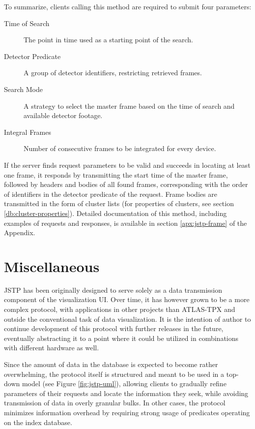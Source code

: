 To summarize, clients calling this method are required to submit four parameters:
\begin{description}
	\item[Time of Search]
	The point in time used as a starting point of the search.

	\item[Detector Predicate]
	A group of detector identifiers, restricting retrieved frames.

	\item[Search Mode]
	A strategy to select the master frame based on the time of search and available detector footage.

	\item[Integral Frames]
	Number of consecutive frames to be integrated for every device.
\end{description}

If the server finds request parameters to be valid and succeeds in locating at least one frame, it responds by transmitting the start time of the master frame, followed by headers and bodies of all found frames, corresponding with the order of identifiers in the detector predicate of the request. Frame bodies are transmitted in the form of cluster lists (for properties of clusters, see section \ref{db:cluster-properties}). Detailed documentation of this method, including examples of requests and responses, is available in section \ref{apx:jstp-frame} of the Appendix.

\section{Miscellaneous}
JSTP has been originally designed to serve solely as a data transmission component of the visualization UI. Over time, it has however grown to be a more complex protocol, with applications in other projects than ATLAS-TPX and outside the conventional task of data visualization. It is the intention of author to continue development of this protocol with further releases in the future, eventually abstracting it to a point where it could be utilized in combinations with different hardware as well.

Since the amount of data in the database is expected to become rather overwhelming, the protocol itself is structured and meant to be used in a top-down model (see Figure \ref{fig:jstp-uml}), allowing clients to gradually refine parameters of their requests and locate the information they seek, while avoiding transmission of data in overly granular bulks. In other cases, the protocol minimizes information overhead by requiring strong usage of predicates operating on the index database.

